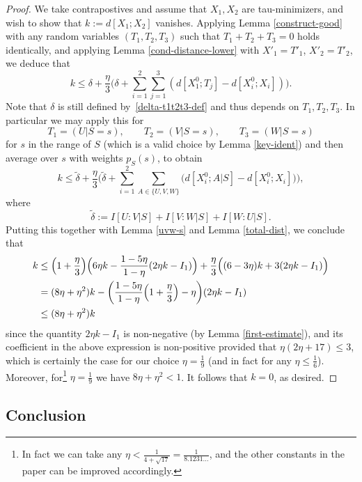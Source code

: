 \begin{proof}
  We take contrapostives and assume that $X_1,X_2$ are tau-minimizers, and wish to show that $k := d[X_1;X_2]$ vanishes.  Applying Lemma \ref{construct-good} with any random variables $(T_1,T_2,T_3)$ such that $T_1+T_2+T_3=0$ holds identically, and applying Lemma \ref{cond-distance-lower} with $X'_1 = T'_1$, $X'_2 = T'_2$, we deduce that
\[
  k \leq \delta + \frac{\eta}{3} \biggl( \delta + \sum_{i=1}^2 \sum_{j = 1}^3 (d[X^0_1;T_j] - d[X^0_i;X_i]) \biggr).
\]
Note that $\delta$ is still defined by~\eqref{delta-t1t2t3-def} and thus depends on $T_1,T_2,T_3$.
In particular we may apply this for
\[
  T_1 = (U | S = s),\qquad T_2 = (V | S = s), \qquad T_3 = (W | S = s)
\]
for $s$ in the range of $S$ (which is a valid choice by Lemma \ref{key-ident}) and then average over $s$ with weights $p_S(s)$, to obtain
\[ k \leq \tilde \delta + \frac{\eta}{3} \biggl( \tilde \delta + \sum_{i=1}^2 \sum_{A\in\{U,V,W\}} \bigl(  d[X^0_i;A|S] - d[X^0_i;X_i]\bigr) \biggr),\]
where
\[
  \tilde \delta :=  I[U : V | S] + I[V : W | S] + I[W : U | S].
\]
Putting this together with Lemma \ref{uvw-s} and Lemma \ref{total-dist}, we conclude that
\begin{align*}
  k &\leq \Bigl(1+\frac{\eta}{3}\Bigr)\Bigl(6\eta k-\frac{1-5\eta}{1-\eta}(2\eta k-I_1)\Bigr)+\frac{\eta}{3}\Bigl((6-3\eta)k+3(2\eta k-I_1)\Bigr)\\
  &= (8\eta + \eta^2) k - \biggl( \frac{1 - 5 \eta}{1-\eta}\Bigl(1 + \frac{\eta}{3}\Bigr) -  \eta \biggr)(2 \eta k - I_1)\\
  &\leq (8 \eta + \eta^2) k
 \end{align*}
since the quantity $2 \eta k - I_1$ is non-negative (by Lemma \ref{first-estimate}), and its coefficient in the above expression is non-positive provided that $\eta(2\eta + 17) \le 3$, which is certainly the case for our choice $\eta = \frac{1}{9}$ (and in fact for any $\eta \leq \frac{1}{6}$).
Moreover, for\footnote{In fact we can take any $\eta<\frac{1}{4 + \sqrt{17}} = \frac{1}{8.1231\dots}$, and the other constants in the paper can be improved accordingly.} $\eta=\tfrac{1}{9}$ we have $8 \eta + \eta^2 < 1$. It follows that $k=0$, as desired.
\end{proof}


\subsection{Conclusion}

